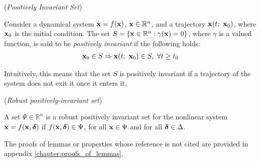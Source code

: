   \begin{definition} (\textit{Positively Invariant Set})
    \label{def:positively_invariant}

    Consider a dynamical system $\dot{\bm{\mathbf{x}}} = f(\bm{\mathbf{x}})$,
    $\bm{\mathbf{x}} \in \mathbb{R}^n$, and a trajectory $\bm{\mathbf{x}}(t;\ \bm{\mathbf{x}}_0)$,
    where $\bm{\mathbf{x}}_0$ is the initial condition. The set
    $S = \{\bm{\mathbf{x}} \in \mathbb{R}^n : \gamma(\bm{\mathbf{x}}) = 0\}$, where
    $\gamma$ is a valued function, is said to be \textit{positively invariant}
    if the following holds:
    \begin{align}
      \vect{x}_0 \in S \Rightarrow \vect{x}(t;\ \vect{x}_0) \in S,\ \forall t \geq t_0
    \end{align}

    Intuitively, this means that the set $S$ is positively invariant if a
    trajectory of the system does not exit it once it enters it. \\[2.5ex]
  \end{definition}


\begin{definition}\cite{ISS_SKATOLINI} (\textit{Robust positively-invariant set})
\label{def:robust_positively_invariant_set}

A set $\Psi \in \mathbb{R}^n$ is a robust positively invariant set for the
nonlinear system $\dot{\bm{\mathbf{x}}} = f(\bm{\mathbf{x}}, \bm{\mathbf{\delta}})$ if
$f(\bm{\mathbf{x}}, \bm{\mathbf{\delta}}) \in \Psi$, for all $\bm{\mathbf{x}} \in \Psi$ and for all
$\bm{\mathbf{\delta}} \in \Delta$.
\\[2.5ex]
\end{definition}




The proofs of lemmas or properties whose reference is not cited are provided
in appendix \ref{chapter:proofs_of_lemmas}.

